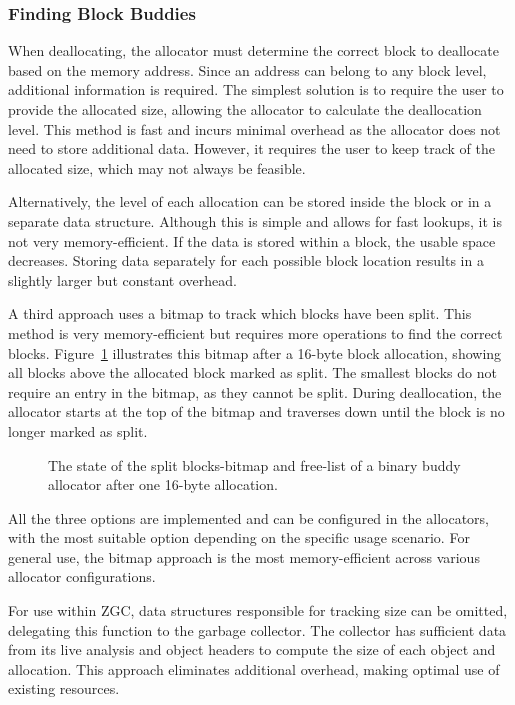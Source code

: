 \subsubsection{Finding Block Buddies} \label{sec:findbuddiesexpl}
When deallocating, the allocator must determine the correct block to deallocate based on the memory address. Since an address can belong to any block level, additional information is required. The simplest solution is to require the user to provide the allocated size, allowing the allocator to calculate the deallocation level. This method is fast and incurs minimal overhead as the allocator does not need to store additional data. However, it requires the user to keep track of the allocated size, which may not always be feasible.

Alternatively, the level of each allocation can be stored inside the block or in a separate data structure. Although this is simple and allows for fast lookups, it is not very memory-efficient. If the data is stored within a block, the usable space decreases. Storing data separately for each possible block location results in a slightly larger but constant overhead.

A third approach uses a bitmap to track which blocks have been split. This method is very memory-efficient but requires more operations to find the correct blocks. Figure~\ref{fig:buddybmapsplit} illustrates this bitmap after a 16-byte block allocation, showing all blocks above the allocated block marked as split. The smallest blocks do not require an entry in the bitmap, as they cannot be split. During deallocation, the allocator starts at the top of the bitmap and traverses down until the block is no longer marked as split.

\begin{figure}[h]
    \centering
    
    \caption{The state of the split blocks-bitmap and free-list of a binary buddy allocator after one 16-byte allocation.}
    \label{fig:buddybmapsplit}
\end{figure}
\vspace{-0.1cm}
All the three options are implemented and can be configured in the allocators, with the most suitable option depending on the specific usage scenario. For general use, the bitmap approach is the most memory-efficient across various allocator configurations.

For use within ZGC, data structures responsible for tracking size can be omitted, delegating this function to the garbage collector. The collector has sufficient data from its live analysis and object headers to compute the size of each object and allocation. This approach eliminates additional overhead, making optimal use of existing resources.

